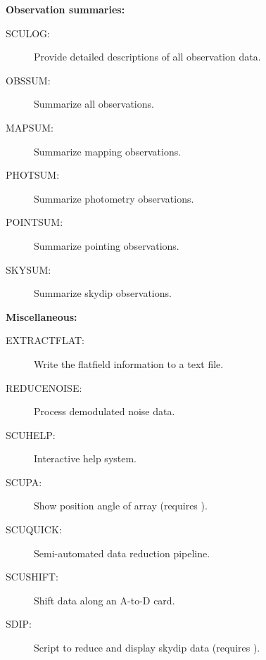 \documentclass[twoside,11pt]{article}
\newcommand{\Kappa}{\xref{{\sc{Kappa}}}{sun95}{}}
\newcommand{\htmlref}[2]{#1}
\newcommand{\xref}[3]{#1}
\renewcommand{\_}{\texttt{\symbol{95}}}
\begin{document}
\begin{description}

\item \textbf{Observation summaries:}

\begin{description}

\item[\htmlref{SCULOG}{SCULOG}:] Provide detailed descriptions of all
observation  data.

\item[\htmlref{OBSSUM}{OBSSUM}:] Summarize all observations.

\item[\htmlref{MAPSUM}{MAPSUM}:] Summarize mapping observations.

\item[\htmlref{PHOTSUM}{PHOTSUM}:] Summarize photometry observations.

\item[\htmlref{POINTSUM}{POINTSUM}:] Summarize pointing observations.

\item[\htmlref{SKYSUM}{SKYSUM}:] Summarize skydip observations.

\end{description}

\item \textbf{Miscellaneous:}

\begin{description}

\item[\htmlref{EXTRACT\_FLAT}{EXTRACT_FLAT}:] Write the flatfield information
to a text file.

\item[\htmlref{REDUCE\_NOISE}{REDUCE_NOISE}:] Process demodulated noise data.

\item[\htmlref{SCUHELP}{SCUHELP}:] Interactive help system.

\item[\htmlref{SCUPA}{SCUPA}:] Show position angle of array (requires \Kappa).

\item[\htmlref{SCUQUICK}{SCUQUICK}:] Semi-automated data reduction pipeline.

\item[\htmlref{SCUSHIFT}{SCUSHIFT}:] Shift data along an A-to-D card.

\item[\htmlref{SDIP}{SDIP}:] Script to reduce and display skydip data
(requires \Kappa). 


\end{description}
\end{description}
\end{document}
